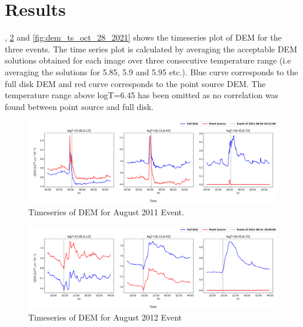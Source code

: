 \section{Results}

, \cref{fig:dem_ts_aug_31_2012} and \cref{fig:dem_ts_oct_28_2021} shows the timeseries plot of DEM for the three events. The time series plot is calculated by averaging the acceptable DEM solutions obtained for each image over three consecutive temperature range (i.e averaging the solutions for 5.85, 5.9 and 5.95 etc.). Blue curve corresponds to the full disk DEM and red curve corresponds to the point source DEM. The temperature range above logT=6.45 has been omitted as no correlation was found between point source and full disk.



\begin{figure}[h!]
    \centering
    \includegraphics[width=\textwidth]{images/dem_ts_aug_04_2011.png}
    \caption[DEM Timeseries for August 2011 Event]{Timeseries of DEM for  August 2011 Event.}
    \label{fig:dem_ts_aug_04_2011}
\end{figure}

\begin{figure}[h!]
    \centering
    \includegraphics[width=\textwidth]{images/dem_ts_aug_31_2012.png}
    \caption[DEM Timeseries for August 2012 Event]{Timeseries of DEM for  August 2012 Event}
    \label{fig:dem_ts_aug_31_2012}
\end{figure}

